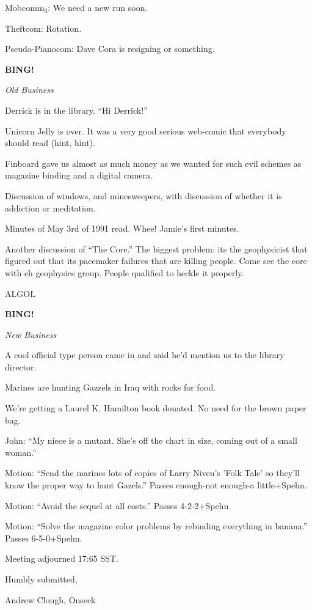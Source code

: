 \documentclass[12pt]{article}
\newcommand{\bing}{{\bf BING!} }
\newcommand{\goto}[1]{\bing \vskip 12pt \centerline{{\em{#1}}}}
\begin{document}
Mobcomm$_3$:  We need a new run soon.

Theftcom:  Rotation.

Pseudo-Pianocom:  Dave Cora is resigning or something.

\goto{Old Business}

Derrick is in the library.  ``Hi Derrick!''

Unicorn Jelly is over.  It was a very good serious web-comic that everybody should read (hint, hint).

Finboard gave us almost as much money as we wanted for such evil schemes as magazine binding and a digital camera.

Discussion of windows, and minesweepers, with discussion of whether it is addiction or meditation.

Minutes of May 3rd of 1991 read.  Whee!  Jamie's first minutes.

Another discussion of ``The Core.''  The biggest problem: its the geophysicist that figured out that its pacemaker failures that are killing people.  Come see the core with eh geophysics group.  People qualified to heckle it properly.

ALGOL

\goto{New Business}

A cool official type person came in and said he'd mention us to the library director.

Marines are hunting Gazzels in Iraq with rocks for food.

We're getting a Laurel K. Hamilton book donated.  No need for the brown paper bag.

John:  ``My niece is a mutant.  She's off the chart in size, coming out of a small woman.''

Motion:  ``Send the marines lots of copies of Larry Niven's 'Folk Tale' so they'll know the proper way to hunt Gazels.''  Passes enough-not enough-a little+Spehn.

Motion:  ``Avoid the sequel at all costs.''  Passes 4-2-2+Spehn

Motion:  ``Solve the magazine color problems by rebinding everything in banana.''  Passes 6-5-0+Spehn.

\vspace{12pt}

\noindent
Meeting adjourned 17:65 SST.

\vspace{18pt}

\centerline{Humbly submitted,}
\centerline{Andrew Clough, Onseck}
\end{document}
